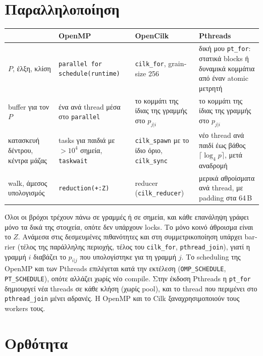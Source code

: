 \documentclass[10pt,a4paper]{article}
\newcommand{\en}[1]{\textlatin{#1}}
\let\origtexttt\texttt
\renewcommand{\texttt}[1]{\textlatin{\origtexttt{#1}}}
\begin{document}
\section{Παραλληλοποίηση}

\begin{table}[h]
\centering\small
\begin{tabular}{@{}p{2.2cm}p{4.3cm}p{4.3cm}p{5.0cm}@{}}
\toprule
 & \en{OpenMP} & \en{OpenCilk} & \en{Pthreads} \\
\midrule
$P$, έλξη, κλίση & \texttt{parallel for schedule(runtime)} & \texttt{cilk\_for}, \en{grainsize} 256 & δική μου \texttt{pt\_for}: στατικά \en{blocks} ή δυναμικά κομμάτια από έναν \en{atomic} μετρητή \\
\en{buffer} για τον $P$ & ένα ανά \en{thread} μέσα στο \texttt{parallel} & το κομμάτι της ίδιας της γραμμής στο $p_{j|i}$ & το κομμάτι της ίδιας της γραμμής στο $p_{j|i}$ \\
κατασκευή δέντρου, κέντρα μάζας & \en{tasks} για παιδιά με $>10^4$ σημεία, \texttt{taskwait} & \texttt{cilk\_spawn} με το ίδιο όριο, \texttt{cilk\_sync} & νέο \en{thread} ανά παιδί έως βάθος $\lceil\log_4 p\rceil$, μετά αναδρομή \\
\en{walk}, άμεσος υπολογισμός & \texttt{reduction(+:Z)} & \en{reducer} (\texttt{cilk\_reducer}) & μερικά αθροίσματα ανά \en{thread}, με \en{padding} στα 64\,\en{B} \\
\bottomrule
\end{tabular}
\vspace{-4pt}
\end{table}

Όλοι οι βρόχοι τρέχουν πάνω σε γραμμές ή σε σημεία, και κάθε επανάληψη γράφει μόνο τα δικά της
στοιχεία, οπότε δεν υπάρχουν \en{locks}. Το μόνο κοινό άθροισμα είναι το $Z$. Ανάμεσα στις
δεσμευμένες πιθανότητες και στη συμμετρικοποίηση υπάρχει \en{barrier} (τέλος της παράλληλης
περιοχής, τέλος του \texttt{cilk\_for}, \texttt{pthread\_join}), γιατί η γραμμή $i$ διαβάζει το
$p_{i|j}$ που υπολογίστηκε για τη γραμμή $j$. Το \en{scheduling} της \en{OpenMP} και των
\en{Pthreads} επιλέγεται κατά την εκτέλεση (\texttt{OMP\_SCHEDULE}, \texttt{PT\_SCHEDULE}), οπότε
αλλάζει χωρίς νέο \en{compile}. Στην έκδοση \en{Pthreads} η \texttt{pt\_for} δημιουργεί νέα
\en{threads} σε κάθε κλήση (χωρίς \en{pool}), και το \en{thread} που περιμένει στο
\texttt{pthread\_join} μένει αδρανές. Η \en{OpenMP} και το \en{Cilk} ξαναχρησιμοποιούν τους
\en{workers} τους.

\section{Ορθότητα}
\end{document}
